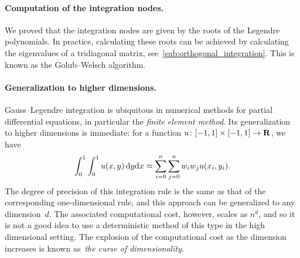 \paragraph{Computation of the integration nodes.}
We proved that the integration nodes are given by the roots of the Legendre polynomials.
In practice, calculating these roots can be achieved by calculating the eigenvalues of a tridiagonal matrix, see~\cref{sub:orthogonal_integration}.
This is known as the Golub--Welsch algorithm.

\paragraph{Generalization to higher dimensions.}
Gauss--Legendre integration is ubiquitous in numerical methods for partial differential equations,
in particular the \emph{finite element method}.
Its generalization to higher dimensions is immediate:
for a function $u\colon [-1, 1] \times [-1, 1] \to \mathbf R$,
we have
\[
    \int_{0}^{1} \int_{0}^{1} u(x, y) \, \mathrm d y \mathrm d x \approx \sum_{i=0}^{n} \sum_{j=0}^{n} w_i w_j u(x_i, y_i).
\]
The degree of precision of this integration rule is the same as
that of the corresponding one-dimensional rule,
and this approach can be generalized to any dimension~$d$.
The associated computational cost,
however, scales as $n^d$,
and so it is not a good idea to use a deterministic method of this type in the high dimensional setting.
The explosion of the computational cost as the dimension increases is known as~\emph{the curse of dimensionality}.


